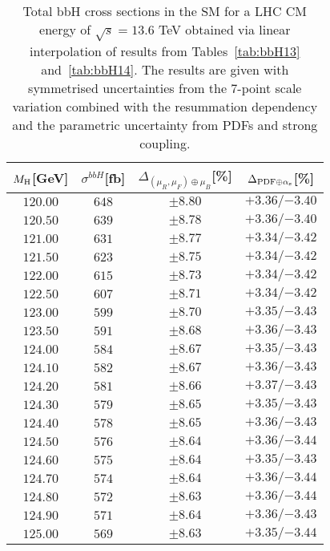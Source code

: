 \begin{table}[ht!]
\caption{Total bbH{} cross sections in the SM for a LHC CM energy of $\sqrt{s}=13.6$ TeV obtained via linear interpolation of results from Tables~\ref{tab:bbH13} and~\ref{tab:bbH14}. The results are given with symmetrised uncertainties from the 7-point scale variation combined with the resummation dependency and the parametric uncertainty from PDFs and strong coupling.}
\label{tab:bbH136}
\begin{center}%
\begin{small}%
\begin{tabular}{cccc}%
\toprule
$M_\mathrm{H}$[GeV] & $\sigma^{bbH}$[fb] & $\Delta_{\left(\mu_{R},\mu_{F}\right)\oplus\mu_{B}}$[\%] & $\Delta_{\mathrm{PDF}\oplus\alpha_{\mathrm{s}}}$[\%]  \\
\midrule
$120.00$ & $648$ & $\pm8.80$ & ${{+3.36}}/{-3.40}$ \\
$120.50$ & $639$ & $\pm8.78$ & ${{+3.36}}/{-3.40}$ \\
$121.00$ & $631$ & $\pm8.77$ & ${{+3.34}}/{-3.42}$ \\
$121.50$ & $623$ & $\pm8.75$ & ${{+3.34}}/{-3.42}$ \\
$122.00$ & $615$ & $\pm8.73$ & ${{+3.34}}/{-3.42}$ \\
$122.50$ & $607$ & $\pm8.71$ & ${{+3.34}}/{-3.42}$ \\
$123.00$ & $599$ & $\pm8.70$ & ${{+3.35}}/{-3.43}$ \\
$123.50$ & $591$ & $\pm8.68$ & ${{+3.36}}/{-3.43}$ \\
$124.00$ & $584$ & $\pm8.67$ & ${{+3.35}}/{-3.43}$ \\
$124.10$ & $582$ & $\pm8.67$ & ${{+3.36}}/{-3.43}$ \\
$124.20$ & $581$ & $\pm8.66$ & ${{+3.37}}/{-3.43}$ \\
$124.30$ & $579$ & $\pm8.65$ & ${{+3.35}}/{-3.43}$ \\
$124.40$ & $578$ & $\pm8.65$ & ${{+3.36}}/{-3.43}$ \\
$124.50$ & $576$ & $\pm8.64$ & ${{+3.36}}/{-3.44}$ \\
$124.60$ & $575$ & $\pm8.64$ & ${{+3.35}}/{-3.43}$ \\
$124.70$ & $574$ & $\pm8.64$ & ${{+3.36}}/{-3.44}$ \\
$124.80$ & $572$ & $\pm8.63$ & ${{+3.36}}/{-3.44}$ \\
$124.90$ & $571$ & $\pm8.64$ & ${{+3.36}}/{-3.43}$ \\
$125.00$ & $569$ & $\pm8.63$ & ${{+3.35}}/{-3.44}$ \\

\end{tabular}
\end{small}
\end{center}
\end{table}
